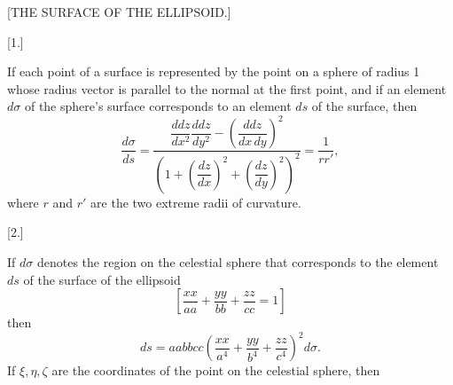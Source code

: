 \clearpage
{}%
\begin{center}{\large [THE SURFACE OF THE ELLIPSOID.]\par}\end{center}
\begin{center}[1.]\end{center}

If each point of a surface is represented by the point on a sphere of radius 1 whose radius vector is parallel to the normal at the first point, and if an element $d\sigma$ of the sphere’s surface corresponds to an element $ds$ of the surface, then
\[
\frac{d\sigma}{ds}=\frac{\dfrac{ddz}{dx^2}\dfrac{ddz}{dy^2}-\left(\dfrac{ddz}{dx\,dy}\right)^2}{\left(1+\left(\dfrac{dz}{dx}\right)^2+\left(\dfrac{dz}{dy}\right)^2\right)^2}=\frac1{rr'},
\]
where $r$ and $r'$ are the two extreme radii of curvature.
\begin{center}[2.]\end{center}

If $d\sigma$ denotes the region on the celestial sphere that corresponds to the element $ds$ of the surface of the ellipsoid
\[
\left[\frac{xx}{aa}+\frac{yy}{bb}+\frac{zz}{cc}=1\right]
\]
then
\[
ds=aabbcc\left(\frac{xx}{a^4}+\frac{yy}{b^4}+\frac{zz}{c^4}\right)^2d\sigma.
\]
If $\xi,\eta,\zeta$ are the coordinates of the point on the celestial sphere, then
